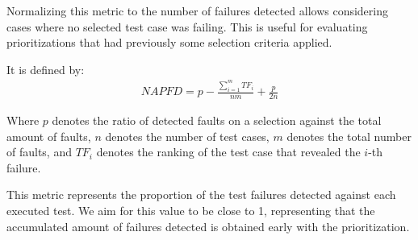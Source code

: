 Normalizing this metric to the number of failures detected allows considering cases where no
selected test case was failing. This is useful for evaluating prioritizations that had previously some selection criteria applied.

It is defined by:
\begin{align*}
NAPFD = p - \frac{\sum_{i=1}^mTF_i}{nm} + \frac{p}{2n}
\end{align*}

Where $p$ denotes the ratio of detected faults on a selection against the total amount of faults,
$n$ denotes the number of test cases, $m$ denotes the total number of faults, and $TF_i$ denotes the ranking of
the test case that revealed the $i$-th failure.

This metric represents the proportion of the test failures detected against each executed test.
We aim for this value to be close to 1, representing that the accumulated amount of 
failures detected is obtained early with the prioritization.